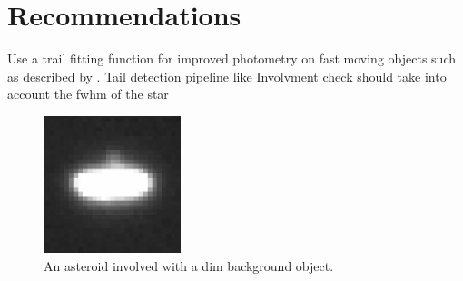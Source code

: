 \documentclass[iop,apj]{emulateapj}
\begin{document}
\section{Recommendations }

Use a trail fitting function for improved photometry on fast moving objects such as described by \cite{veres12}.
Tail detection pipeline like \cite{sonnett11}
Involvment check should take into account the fwhm of the star








\begin{figure}[!htb]
    \centering
    \includegraphics[height=4cm]{images/involved2_copy.png}
    \caption{An asteroid involved with a dim background object. }\label{fig:3}
\end{figure}
\end{document}
